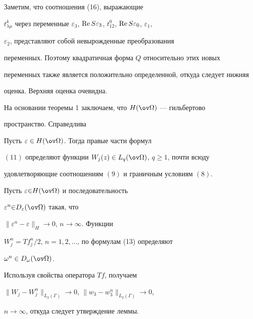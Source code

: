  


\begin{pf} 


Заметим, что соотношения (16), выражающие 


$t^k_{\lambda\mu}$ через переменные $\varepsilon_3$, $\re S 


\varepsilon_3$, $t^0_{12}$, $\re S \varepsilon_0$, $\varepsilon_1$, 


$\varepsilon_2$, представляют собой невырожденные преобразования 


переменных. Поэтому квадратичная форма $Q$ относительно этих новых 


переменных также является положительно определенной, откуда следует нижняя 


оценка. Верхняя оценка очевидна. 


\end{pf} 


 


На основании теоремы 1 заключаем, что $H(\ov\Omega)$ --- гильбертово 


пространство. Справедлива 


 


\begin{lem} 


Пусть $\varepsilon\in H(\ov\Omega)$. Тогда правые части формул 


$(11)$ определяют функции $W_j(z)\in L_q(\ov\Omega)$, $q\ge1$, почти всюду 


удовлетворяющие соотношениям $(9)$ и граничным условиям $(8)$. 


\end{lem} 


 


\begin{pf} 


Пусть $\varepsilon{\in} H(\ov\Omega)$ и последовательность 


$\varepsilon^n{\in} D_\varepsilon(\ov\Omega)$ такая, что 


$\|\varepsilon^n-\varepsilon\|_H\to0$, $n\to\infty$. Функции 


$W^n_j=T f^n_j/2$, $n=1,2,\dotsc$, по формулам (13) определяют 


$\omega^n\in D_\omega(\ov\Omega)$. 


Используя свойства оператора $T f$, получаем 


$\|W_j-W^n_j\|_{L_2(\Gamma)}\to0$, $\|w_3-w^n_3\|_{L_2(\Gamma)}\to0$, 


$n\to\infty$, откуда следует утверждение леммы. 


\end{pf} 


